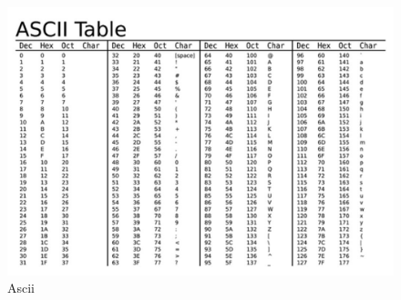 \begin{figure}[h!]
    \centering
    \includegraphics[width=1\linewidth]{ascii.jpg}
    \caption{Ascii}
    \label{fig:enter-label}
\end{figure}
